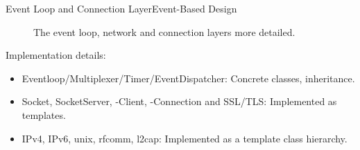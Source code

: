 \begin{frame}{Event Loop and Connection Layer}{Event-Based Design}
\begin{center}
\begin{figure}
      \caption{The event loop, network and connection layers more detailed.}
    \end{figure}
  \end{center}
  Implementation details:
  \begin{itemize}
    \item \alert{Eventloop/Multiplexer/Timer/EventDispatcher}: Concrete classes, inheritance.
     \item \alert{Socket, SocketServer, -Client, -Connection and SSL/TLS}: Implemented as templates.
     \item \alert{IPv4, IPv6, unix, rfcomm, l2cap}: Implemented as a template class hierarchy.
  \end{itemize}
\end{frame}
